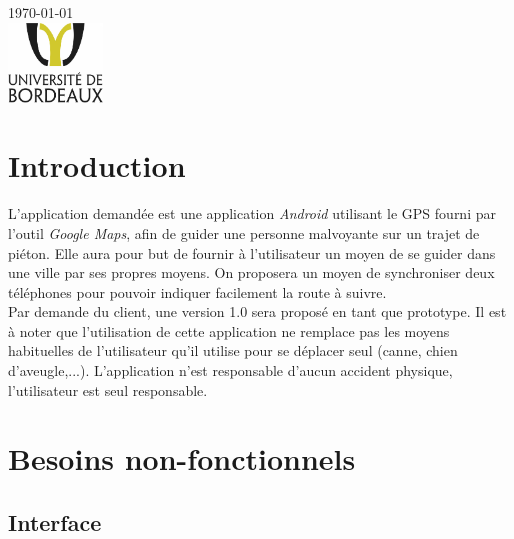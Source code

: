 \documentclass[12pt]{report}
\begin{document}
\begin{titlepage}
{\large \today}\\[1.5cm] %


\includegraphics[height=80px]{bxlogo.jpg}\\[1cm] %
 

\vfill 

\end{titlepage}



\tableofcontents

\newpage

\chapter*{Introduction}
\setcounter{chapter}{1}

L'application demandée est une application \textit{Android} utilisant le GPS fourni par l'outil \textit{Google Maps}, afin de guider une personne malvoyante sur un trajet de piéton. Elle aura pour but de fournir à l'utilisateur un moyen de se guider dans une ville par ses propres moyens. On proposera un moyen de synchroniser deux téléphones pour pouvoir indiquer facilement la route à suivre. \\
Par demande du client, une version 1.0 sera proposé en tant que prototype. Il est à noter que l'utilisation de cette application ne remplace pas les moyens habituelles de l'utilisateur qu'il utilise pour se déplacer seul (canne, chien d'aveugle,...). L'application n'est responsable d'aucun accident physique, l'utilisateur est seul responsable.

\chapter*{Besoins non-fonctionnels}

\section{Interface}
\end{document}
